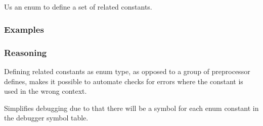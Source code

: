 \subsection*{\myRule{}}

Us an enum to define a set of related constants.

\subsubsection*{Examples}

\begin{minipage}[t]{0.47\linewidth}
    
\end{minipage}
\hfill
\begin{minipage}[t]{0.47\linewidth}
    
\end{minipage}

\subsubsection{Reasoning}

Defining related constants as enum type, as opposed to a group of preprocessor defines, makes it possible to automate checks for errors where the constant is used in the wrong context.

Simplifies debugging due to that there will be a symbol for each enum constant in the debugger symbol table.
